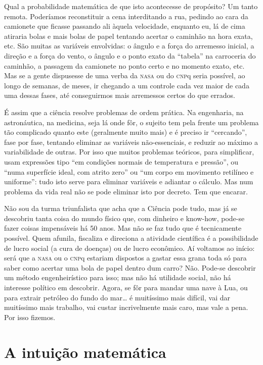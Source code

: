 Qual a probabilidade matemática de que isto acontecesse de propósito?
Um tanto remota. Poderíamos reconstituir a cena interditando a rua,
pedindo ao cara da camionete que ficasse passando ali àquela
velocidade, enquanto eu, lá de cima atiraria bolas e mais bolas de
papel tentando acertar o caminhão na hora exata, etc. São muitas as
variáveis envolvidas: o ângulo e a força do arremesso inicial, a
direção e a força do vento, o ângulo e o ponto exato da “tabela” na
carroceria do caminhão, a passagem da camionete no ponto certo e no
momento exato, etc. Mas se a gente dispusesse de uma verba da \textsc{nasa} ou
do \textsc{cnp}q seria possível, ao longo de semanas, de meses, ir chegando a
um controle cada vez maior de cada uma dessas fases, até conseguirmos
mais arremessos certos do que errados.

É assim que a ciência resolve problemas de ordem prática. Na
engenharia, na astronáutica, na medicina, seja lá onde fôr, o sujeito
tem pela frente um problema tão complicado quanto este (geralmente
muito mais) e é preciso ir “cercando”, fase por fase, tentando
eliminar as variáveis não-essenciais, e reduzir ao máximo a
variabilidade de outras. Por isso que muitos problemas teóricos, para
simplificar, usam expressões tipo “em condições normais de
temperatura e pressão”, ou “numa superfície ideal, com atrito zero”
ou “um corpo em movimento retilíneo e uniforme”: tudo isto serve para
eliminar variáveis e adiantar o cálculo. Mas num problema da vida
real não se pode eliminar isto por decreto. Tem que encarar.

Não sou da turma triunfalista que acha que a Ciência pode tudo, mas já
se descobriu tanta coisa do mundo físico que, com dinheiro e
know-how, pode-se fazer coisas impensáveis há 50 anos. Mas não se faz
tudo que é tecnicamente possível. Quem afunila, fiscaliza e direciona
a atividade científica é a possibilidade de lucro social (a cura de
doenças) ou de lucro econômico. Aí voltamos ao início: será que a
\textsc{nasa} ou o \textsc{cnp}q estariam dispostos a gastar essa grana toda só para
saber como acertar uma bola de papel dentro dum carro? Não. Pode-se
descobrir um método engenheirístico para isso; mas não há utilidade
social, não há interesse político em descobrir. Agora, se fôr para
mandar uma nave à Lua, ou para extrair petróleo do fundo do mar… é
muitíssimo mais difícil, vai dar muitíssimo mais trabalho, vai custar
incrivelmente mais caro, mas vale a pena. Por isso fizemos.

\chapter{A intuição matemática}

